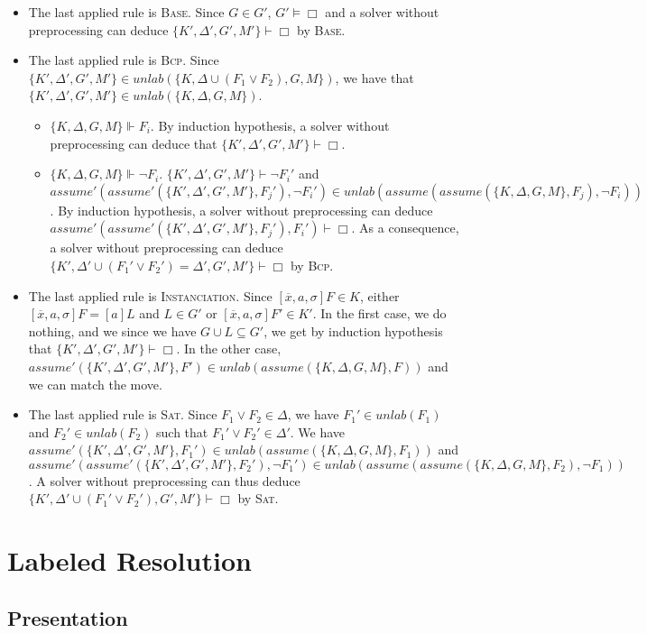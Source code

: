 \documentclass[a4paper,10pt]{report}
\newcommand{\A}{\mathit{assume}}
\newcommand{\unlab}{\mathit{unlab}}
\begin{document}
\begin{itemize}
 \item The last applied rule is \textsc{Base}. Since $G\in G'$, $G'\vDash\Box$
and a solver without preprocessing can deduce $\{K',\Delta',G',M'\}\vdash\Box$ by \textsc{Base}.
 \item The last applied rule is \textsc{Bcp}.
Since $\{K',\Delta',G',M'\}\in\unlab(\{K,\Delta\cup(F_1\vee F_2),G,M\})$, we have that
$\{K',\Delta',G',M'\}\in\unlab(\{K,\Delta,G,M\})$.
\begin{itemize}
 \item $\{K,\Delta,G,M\}\Vdash F_i$.
By induction hypothesis, a solver without preprocessing can deduce that $\{K',\Delta',G',M'\}\vdash\Box$.
 \item $\{K,\Delta,G,M\}\Vdash\neg F_i$. $\{K',\Delta',G',M'\}\vdash\neg F_i'$ and
$\A'(\A'(\{K',\Delta',G',M'\},F_j'),\neg F_i')\in\unlab(\A(\A(\{K,\Delta,G,M\}, F_j),\neg F_i))$.
By induction hypothesis, a solver without preprocessing
can deduce $\A'(\A'(\{K',\Delta',G',M'\},F_j'),F_i')\vdash\Box$.
As a consequence, a solver without preprocessing
can deduce $\{K',\Delta'\cup(F_1'\vee F_2')=\Delta',G',M'\}\vdash\Box$ by \textsc{Bcp}.
\end{itemize}
 \item The last applied rule is \textsc{Instanciation}. Since $[\overline x, a,\sigma]F\in K$,
either $[\overline x, a,\sigma]F = [a]L$ and $L\in G'$ or $[\overline x, a,\sigma]F'\in K'$.
In the first case, we do nothing, and we since we have $G\cup L\subseteq G'$,
we get by induction hypothesis that $\{K',\Delta',G',M'\}\vdash\Box$. In the other case,
$\A'(\{K',\Delta',G',M'\},F')\in\unlab(\A(\{K,\Delta,G,M\},F))$ and we can match the move.
 \item The last applied rule is \textsc{Sat}. Since $F_1\vee F_2\in\Delta$,
we have $F_1'\in\unlab(F_1)$ and $F_2'\in\unlab(F_2)$ such that $F_1'\vee F_2'\in\Delta'$.
We have $\A'(\{K',\Delta',G',M'\},F_1')\in\unlab(\A(\{K,\Delta,G,M\},F_1))$ and
$\A'(\A'(\{K',\Delta',G',M'\},F_2'),\neg F_1')\in\unlab(\A(\A(\{K,\Delta,G,M\},F_2),\neg F_1))$.
A solver without preprocessing can thus deduce
$\{K',\Delta'\cup(F_1'\vee F_2'),G',M'\}\vdash\Box$ by \textsc{Sat}.
\end{itemize}


\chapter{Labeled Resolution}
\section{Presentation}
\end{document}
